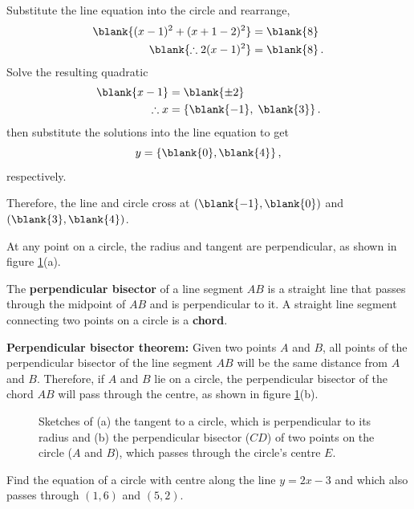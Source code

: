 \begin{solution}
Substitute the line equation into the circle and rearrange, 
\begin{align*}
    \blank{(x-1)^2 + (x+1-2)^2} &= \blank{8} \\
    \blank{\therefore 2(x-1)^2} &= \blank{8} \, .
\end{align*}
Solve the resulting quadratic
\begin{align*}
    \blank{x-1} &= \blank{\pm 2}\\
    \therefore x &= \{\blank{-1},\; \blank{3}\} \, .
\end{align*}
then substitute the solutions into the line equation to get
\[
    y = \{\blank{0},\blank{4}\} \, ,
\]
respectively. \par
Therefore, the line and circle cross at $(\blank{-1},\blank{0})$ and $(\blank{3},\blank{4})$.
\end{solution}

At any point on a circle, the radius and tangent are perpendicular, as shown in figure \ref{fig:perp_rad}(a). 

\begin{definition}
    The \textbf{perpendicular bisector} of a line segment $AB$ is a straight line that passes through the midpoint of $AB$ and is perpendicular to it.
    A straight line segment connecting two points on a circle is a \textbf{chord}.
\end{definition}

\textbf{Perpendicular bisector theorem:} Given two points $A$ and $B$, all points of the perpendicular bisector of the line segment $AB$ will be the same distance from $A$ and $B$. Therefore, if $A$ and $B$ lie on a circle, the perpendicular bisector of the chord $AB$ will pass through the centre, as shown in figure \ref{fig:perp_rad}(b). 

\begin{figure}[h!]
    \centering
    \hfill
    \caption{Sketches of (a) the tangent to a circle, which is perpendicular to its radius and (b) the perpendicular bisector ($CD$) of two points on the circle ($A$ and $B$), which passes through the circle's centre $E$.}
    \label{fig:perp_rad}
\end{figure}

\newtexpage
\begin{example}[Lecture]
Find the equation of a circle with centre along the line $y=2x-3$ and which also passes through $(1,6)$ and $(5,2)$.
\end{example}

